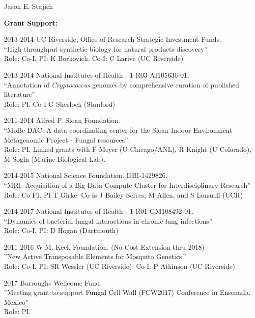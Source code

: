 \documentclass[10pt]{article}
\begin{document}
\begin{cv}{\centerline{Jason E. Stajich}}
\begin{cvlistcompact}{\bf Grant Support:}
\item [2013-2014] UC Riverside, Office of Research Strategic Investment
  Funds. \\
``High-throughput synthetic biology for natural products discovery'' \\
Role: Co-I. PI: K Borkovich. Co-I: C Larive (UC Riverside)

\item [2013-2014] National Institutes of Health - 1-R03-AI105636-01. \\
``Annotation of \textit{Cryptococcus} genomes by comprehensive
  curation of published literature'' \\
Role: PI. Co-I G Sherlock (Stanford)

  \item [2011-2014] Alfred P. Sloan Foundation. \\
``MoBe DAC: A data coordinating center for the Sloan Indoor
Environment Metagenomic Project - Fungal resources''. \\
Role: PI.  Linked grants with F Meyer (U Chicago/ANL), R Knight (U Colorado), M Sogin (Marine Biological Lab).

\item [2014-2015] National Science Foundation. DBI-1429826. \\
``MRI: Acquisition of a Big Data Compute Cluster for Interdisciplinary
  Research''
Role: Co PI. PI T Girke. Co-Is J Bailey-Serres, M Allen, and S Lonardi (UCR)

\item [2014-2017] National Institutes of Health - 1-R01-GM108492-01. \\
``Dynamics of bacterial-fungal interactions in chronic lung infections'' \\
  Role: Co-I. PI: D Hogan (Dartmouth)

  \item [2011-2016] W.M. Keck Foundation. (No Cost Extension thru 2018) \\
''New Active Transposable Elements for Mosquito Genetics.'' \\
Role: Co-I. PI: SR Wessler (UC Riverside). Co-I: P Atkinson (UC Riverside).

\item [2017] Burroughs Wellcome Fund. \\
''Meeting grant to support Fungal Cell Wall (FCW2017) Conference in Ensenada, Mexico'' \\
Role: PI.


\end{cvlistcompact}
\end{cv}
\end{document}
